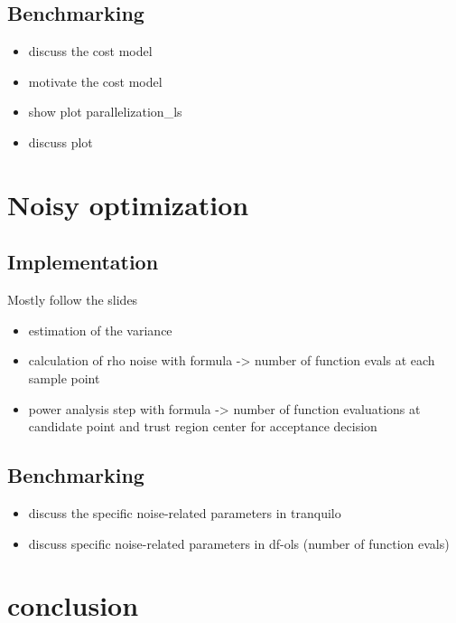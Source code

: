 \subsection{Benchmarking}
\begin{itemize}
    \item discuss the cost model
    \item motivate the cost model
    \item show plot parallelization\_ls
    \item discuss plot
\end{itemize}

\section{Noisy optimization}

\subsection{Implementation}
Mostly follow the slides
\begin{itemize}
    \item estimation of the variance
    \item calculation of rho noise with formula -> number of function evals at each sample point
    \item power analysis step with formula -> number of function evaluations at candidate point and trust region center for acceptance decision
\end{itemize}
\subsection{Benchmarking}
\begin{itemize}
    \item discuss the specific noise-related parameters in tranquilo
    \item discuss specific noise-related parameters in df-ols (number of function evals)
\end{itemize}

\section{conclusion}
